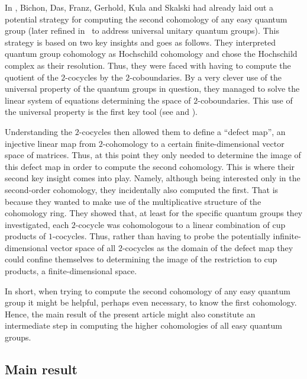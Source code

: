 \documentclass[10pt,a4paper]{amsart}
\numberwithin{equation}{section}
\begin{document}
In \cite{BichonFranzGerhold2017, DasFranzKulaSkalski2018}, Bichon, Das, Franz, Gerhold, Kula and Skalski had already laid out a potential strategy for computing the second cohomology of any easy quantum group (later refined in~\cite{DasFranzKulaSkalski2023} to address  universal unitary quantum groups). This strategy is based on two key insights and goes as follows. They interpreted quantum group cohomology as Hochschild cohomology and chose the Hochschild complex as their resolution. Thus, they were faced with having to compute the quotient of the $2$-cocycles by the $2$-coboundaries. By a very clever use of the universal property of the quantum groups in question,  they managed to solve the linear system of equations determining the space of $2$-coboundaries. This use of the universal property is the first key tool (see \cite[Lemma~5.4]{BichonFranzGerhold2017} and \cite[Lemma~4.1]{DasFranzKulaSkalski2018}).

Understanding the $2$-cocycles then allowed them to define a ``defect map'', an injective linear map  from  $2$-cohomology to a certain finite-dimensional vector space of matrices. Thus, at this point they only needed to determine the image of this defect map in order to compute the second cohomology. This is where their second key insight  comes into play. Namely, although being interested only in the second-order cohomology, they incidentally also computed the first. That is because they wanted to make  use of the multiplicative structure of the cohomology ring. They showed that, at least for the specific quantum groups they investigated, each $2$-cocycle was cohomologous to a linear combination of cup products of $1$-cocycles. Thus, rather than having to probe the potentially infinite-dimensional vector space of all $2$-cocycles as the domain of the defect map they could confine themselves to determining the image of the restriction to cup products, a finite-dimensional space.

In short, when trying to compute the second cohomology of any easy quantum group it might be helpful, perhaps even necessary, to know the first cohomology. Hence, the main result of the present article might also constitute an intermediate step in computing the higher cohomologies of all easy quantum groups.

\subsection{Main result}
\label{section:introduction-main-results}
\end{document}
